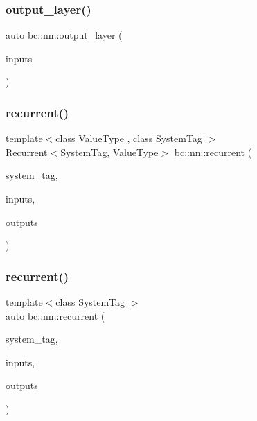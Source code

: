 \subsubsection{\texorpdfstring{output\+\_\+layer()}{output\_layer()}\hspace{0.1cm}{\footnotesize\ttfamily [3/3]}}
{\footnotesize\ttfamily auto bc\+::nn\+::output\+\_\+layer (\begin{DoxyParamCaption}\item[{int}]{inputs }\end{DoxyParamCaption})}

\mbox{\label{namespacebc_1_1nn_ae3f19f032dee5e9dd4916e0caf6ae21b}} 
\subsubsection{\texorpdfstring{recurrent()}{recurrent()}\hspace{0.1cm}{\footnotesize\ttfamily [1/3]}}
{\footnotesize\ttfamily template$<$class Value\+Type , class System\+Tag $>$ \\
\hyperlink{structbc_1_1nn_1_1Recurrent}{Recurrent}$<$System\+Tag, Value\+Type$>$ bc\+::nn\+::recurrent (\begin{DoxyParamCaption}\item[{System\+Tag}]{system\+\_\+tag,  }\item[{int}]{inputs,  }\item[{int}]{outputs }\end{DoxyParamCaption})}

\mbox{\label{namespacebc_1_1nn_af907049010c811e5f6d1f094935e8b07}} 
\subsubsection{\texorpdfstring{recurrent()}{recurrent()}\hspace{0.1cm}{\footnotesize\ttfamily [2/3]}}
{\footnotesize\ttfamily template$<$class System\+Tag $>$ \\
auto bc\+::nn\+::recurrent (\begin{DoxyParamCaption}\item[{System\+Tag}]{system\+\_\+tag,  }\item[{int}]{inputs,  }\item[{int}]{outputs }\end{DoxyParamCaption})}

